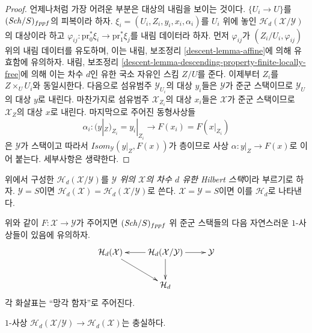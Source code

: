 \begin{proof}
언제나처럼 가장 어려운 부분은 대상의 내림을 보이는 것이다.
$\{U_i \to U\}$를 $(\mathit{Sch}/S)_{fppf}$의 피복이라 하자.
$\xi_i = (U_i, Z_i, y_i, x_i, \alpha_i)$를 $U_i$ 위에 놓인
$\mathcal{H}_d(\mathcal{X}/\mathcal{Y})$의 대상이라 하고
$\varphi_{ij} : \text{pr}_0^*\xi_i \to \text{pr}_1^*\xi_j$를 내림 데이터라
하자. 먼저 $\varphi_{ij}$가 $(Z_i/U_i, \varphi_{ij})$ 위의 내림 데이터를
유도하며, 이는 내림, 보조정리 \ref{descent-lemma-affine}에 의해 유효함에
유의하자. 내림, 보조정리
\ref{descent-lemma-descending-property-finite-locally-free}에 의해 이는
차수 $d$인 유한 국소 자유인 스킴 $Z/U$를 준다. 이제부터 $Z_i$를
$Z \times_U U_i$와 동일시한다. 다음으로 섬유범주 $\mathcal{Y}_{U_i}$의
대상 $y_i$들은 $\mathcal{Y}$가 준군 스택이므로 $\mathcal{Y}_U$의 대상
$y$로 내린다. 마찬가지로 섬유범주 $\mathcal{X}_{Z_i}$의 대상 $x_i$들은
$\mathcal{X}$가 준군 스택이므로 $\mathcal{X}_Z$의 대상 $x$로 내린다.
마지막으로 주어진 동형사상들
$$
\alpha_i :
(y|_Z)_{Z_i} = y_i|_{Z_i}
\longrightarrow
F(x_i) = F(x|_{Z_i})
$$
은 $\mathcal{Y}$가 스택이고 따라서
$\mathit{Isom}_\mathcal{Y}(y|_Z, F(x))$가 층이므로 사상
$\alpha : y|_Z \to F(x)$로 이어 붙는다. 세부사항은 생략한다.
\end{proof}

\begin{definition}
\label{definition-hilbert-d-stack}
위에서 구성한 $\mathcal{H}_d(\mathcal{X}/\mathcal{Y})$를
{\it $\mathcal{Y}$ 위의 $\mathcal{X}$의 차수 $d$ 유한 Hilbert 스택}이라
부르기로 하자. $\mathcal{Y} = S$이면
$\mathcal{H}_d(\mathcal{X}) = \mathcal{H}_d(\mathcal{X}/\mathcal{Y})$로
쓴다. $\mathcal{X} = \mathcal{Y} = S$이면 이를 $\mathcal{H}_d$로 나타낸다.
\end{definition}

\noindent
위와 같이 $F : \mathcal{X} \to \mathcal{Y}$가 주어지면
$(\mathit{Sch}/S)_{fppf}$ 위 준군 스택들의 다음 자연스러운 $1$-사상들이 있음에
유의하자.
\begin{equation}
\label{equation-diagram-hilbert-d-stack}
\vcenter{
\xymatrix{
\mathcal{H}_d(\mathcal{X}) \ar[rd] &
\mathcal{H}_d(\mathcal{X}/\mathcal{Y}) \ar[d] \ar[l] \ar[r] &
\mathcal{Y} \\
& \mathcal{H}_d
}
}
\end{equation}
각 화살표는 ``망각 함자''로 주어진다.

\begin{lemma}
\label{lemma-faithful-hilbert}
 $1$-사상
$\mathcal{H}_d(\mathcal{X}/\mathcal{Y}) \to \mathcal{H}_d(\mathcal{X})$는
충실하다.
\end{lemma}

